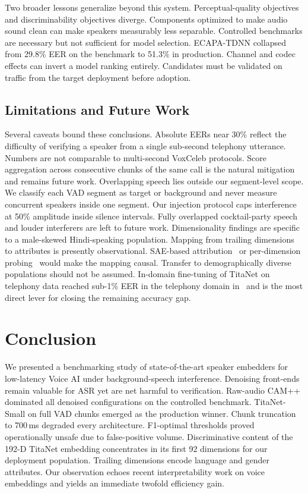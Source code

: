 \documentclass{llncs}
\begin{document}
Two broader lessons generalize beyond this system. Perceptual-quality objectives and discriminability objectives diverge. Components optimized to make audio sound clean can make speakers measurably less separable. Controlled benchmarks are necessary but not sufficient for model selection. ECAPA-TDNN collapsed from 29.8\% EER on the benchmark to 51.3\% in production. Channel and codec effects can invert a model ranking entirely. Candidates must be validated on traffic from the target deployment before adoption.

\subsection{Limitations and Future Work}
Several caveats bound these conclusions. Absolute EERs near 30\% reflect the difficulty of verifying a speaker from a single sub-second telephony utterance. Numbers are not comparable to multi-second VoxCeleb protocols. Score aggregation across consecutive chunks of the same call is the natural mitigation and remains future work. Overlapping speech lies outside our segment-level scope. We classify each VAD segment as target or background and never measure concurrent speakers inside one segment. Our injection protocol caps interference at 50\% amplitude inside silence intervals. Fully overlapped cocktail-party speech and louder interferers are left to future work. Dimensionality findings are specific to a male-skewed Hindi-speaking population. Mapping from trailing dimensions to attributes is presently observational. SAE-based attribution~\cite{sae} or per-dimension probing~\cite{raj2019} would make the mapping causal. Transfer to demographically diverse populations should not be assumed. In-domain fine-tuning of TitaNet on telephony data reached sub-1\% EER in the telephony domain in~\cite{sae} and is the most direct lever for closing the remaining accuracy gap.

\section{Conclusion}\label{sec:conclusion}
We presented a benchmarking study of state-of-the-art speaker embedders for low-latency Voice AI under background-speech interference. Denoising front-ends remain valuable for ASR yet are net harmful to verification. Raw-audio CAM++ dominated all denoised configurations on the controlled benchmark. TitaNet-Small on full VAD chunks emerged as the production winner. Chunk truncation to 700\,ms degraded every architecture. F1-optimal thresholds proved operationally unsafe due to false-positive volume. Discriminative content of the 192-D TitaNet embedding concentrates in its first 92 dimensions for our deployment population. Trailing dimensions encode language and gender attributes. Our observation echoes recent interpretability work on voice embeddings and yields an immediate twofold efficiency gain.
\end{document}
